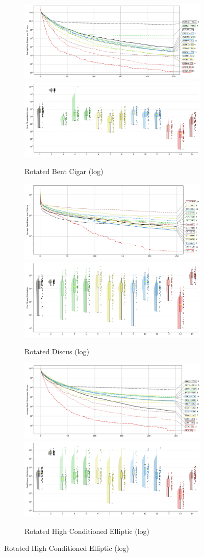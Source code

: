\begin{figure}[p]
\begin{subfigure}{1\textwidth}
    \centering
    \includegraphics[width=.49\textwidth]{Figures/results/100/Rotated_Bent_Cigar_All_selected_algorithms_dim100_annot_legend.png}
    \includegraphics[width=.49\textwidth]{Figures/results/100/Rotated_Bent_Cigar_all_dim100_raincloud_vertical.png}
    \caption{Rotated Bent Cigar (log)}
\end{subfigure}

\begin{subfigure}{1\textwidth}
    \centering
    \includegraphics[width=.49\textwidth]{Figures/results/100/Rotated_Discus_All_selected_algorithms_dim100_annot_legend.png}
    \includegraphics[width=.49\textwidth]{Figures/results/100/Rotated_Discus_all_dim100_raincloud_vertical.png}
    \caption{Rotated Discus (log)}
\end{subfigure}

\begin{subfigure}{1\textwidth}
    \centering
    \includegraphics[width=.49\textwidth]{Figures/results/100/Rotated_High_Conditioned_Elliptic_All_selected_algorithms_dim100_annot_legend.png}
    \includegraphics[width=.49\textwidth]{Figures/results/100/Rotated_High_Conditioned_Elliptic_all_dim100_raincloud_vertical.png}
    \caption{Rotated High Conditioned Elliptic (log)}
\end{subfigure}


\end{figure}
